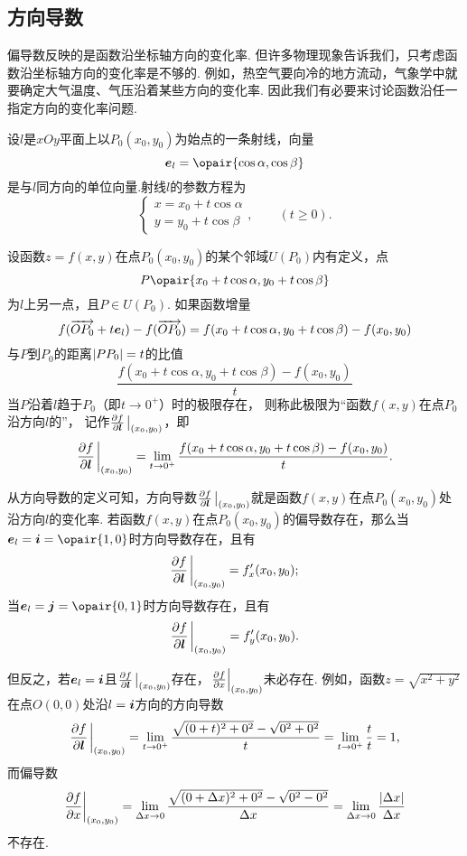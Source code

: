 \subsection{方向导数}
偏导数反映的是函数沿坐标轴方向的变化率.
但许多物理现象告诉我们，只考虑函数沿坐标轴方向的变化率是不够的.
例如，热空气要向冷的地方流动，气象学中就要确定大气温度、气压沿着某些方向的变化率.
因此我们有必要来讨论函数沿任一指定方向的变化率问题.

\begin{definition}
设\(l\)是\(xOy\)平面上以\(P_0(x_0,y_0)\)为始点的一条射线，向量\[
\mat{e}_l=\opair{\cos\alpha,\cos\beta}
\]是与\(l\)同方向的单位向量.射线\(l\)的参数方程为\[
\left\{ \begin{array}{l}
x=x_0+t\cos\alpha \\
y=y_0+t\cos\beta
\end{array} \right., \qquad (t \geq 0).
\]

设函数\(z=f(x,y)\)在点\(P_0(x_0,y_0)\)的某个邻域\(U(P_0)\)内有定义，点\[
P\opair{x_0+t\cos\alpha,y_0+t\cos\beta}
\]为\(l\)上另一点，且\(P \in U(P_0)\).
如果函数增量\[
f(\overrightarrow{O P_0} + t \boldsymbol{e}_l) - f(\overrightarrow{O P_0})
= f(x_0+t\cos\alpha,y_0+t\cos\beta)-f(x_0,y_0)
\]与\(P\)到\(P_0\)的距离\(\abs{PP_0}=t\)的比值\[
\frac{f(x_0+t\cos\alpha,y_0+t\cos\beta)-f(x_0,y_0)}{t}
\]当\(P\)沿着\(l\)趋于\(P_0\)（即\(t\to0^+\)）时的极限存在，
则称此极限为“函数\(f(x,y)\)在点\(P_0\)沿方向\(l\)的”，
记作\(\pdv{f}{\mat{l}}\eval_{(x_0,y_0)}\)，即\[
\pdv{f}{\mat{l}}\eval_{(x_0,y_0)}
=\lim\limits_{t\to0^+} \frac{f(x_0+t\cos\alpha,y_0+t\cos\beta)-f(x_0,y_0)}{t}.
\]
\end{definition}

从方向导数的定义可知，方向导数\(\pdv{f}{\mat{l}}\eval_{(x_0,y_0)}\)就是函数\(f(x,y)\)在点\(P_0(x_0,y_0)\)处沿方向\(l\)的变化率.
若函数\(f(x,y)\)在点\(P_0(x_0,y_0)\)的偏导数存在，那么当\(\mat{e}_l = \mat{i} = \opair{1,0}\)时方向导数存在，且有\[
\pdv{f}{\mat{l}}\eval_{(x_0,y_0)} = f'_x(x_0,y_0);
\]当\(\mat{e}_l = \mat{j} = \opair{0,1}\)时方向导数存在，且有\[
\pdv{f}{\mat{l}}\eval_{(x_0,y_0)} = f'_y(x_0,y_0).
\]

但反之，若\(\boldsymbol{e}_l = \boldsymbol{i}\)且\(\pdv{f}{\mat{l}}\eval_{(x_0,y_0)}\)存在，\(\eval{\pdv{f}{x}}_{(x_0,y_0)}\)未必存在.
例如，函数\(z = \sqrt{x^2+y^2}\)在点\(O(0,0)\)处沿\(l = \boldsymbol{i}\)方向的方向导数\[
\pdv{f}{\mat{l}}\eval_{(x_0,y_0)}
= \lim\limits_{t\to0^+} \frac{\sqrt{(0+t)^2+0^2}-\sqrt{0^2+0^2}}{t}
= \lim\limits_{t\to0^+} \frac{t}{t} = 1,
\]而偏导数\[
\eval{\pdv{f}{x}}_{(x_0,y_0)}
= \lim\limits_{\increment x\to0} \frac{\sqrt{(0+\increment x)^2+0^2}-\sqrt{0^2-0^2}}{\increment x}
= \lim\limits_{\increment x\to0} \frac{\abs{\increment x}}{\increment x}
\]不存在.

